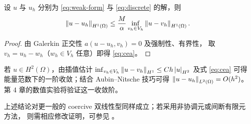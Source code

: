 \begin{proposition}[Céa 引理]\label{prop:cea}
设 $u$ 与 $u_h$ 分别为 \eqref{eq:weak-form} 与 \eqref{eq:discrete} 的解，则
\begin{equation}\label{eq:cea}
\left\lVert u-u_h\right\rVert_{H^1(\Omega)}\le \frac{M}{\alpha}\inf_{v_h\in V_h}\left\lVert u-v_h\right\rVert_{H^1(\Omega)}.
\end{equation}
\end{proposition}

\begin{proof}
由 Galerkin 正交性 $a(u-u_h,v_h)=0$ 及强制性、有界性，
取 $v_h=u_h-w_h$（$w_h\in V_h$ 任意）即得 \eqref{eq:cea}。
\end{proof}

\begin{example}
若 $u\in H^2(\Omega)$，由插值估计 $\inf_{v_h\in V_h}\left\lVert u-v_h\right\rVert_{H^1}\le Ch\left\lvert u\right\rvert_{H^2}$
及式 \eqref{eq:cea} 可得能量范数下的一阶收敛；结合 Aubin--Nitsche 技巧可得
$\left\lVert u-u_h\right\rVert_{L^2(\Omega)}=O(h^2)$。第 4 章的数值实验将验证这一收敛阶。
\end{example}

\begin{remark}
上述结论对更一般的 coercive 双线性型同样成立；若采用非协调元或间断有限元方法，
则需相应修改证明，可参见 \cite{brenner2008,ciarlet1978}。
\end{remark}

